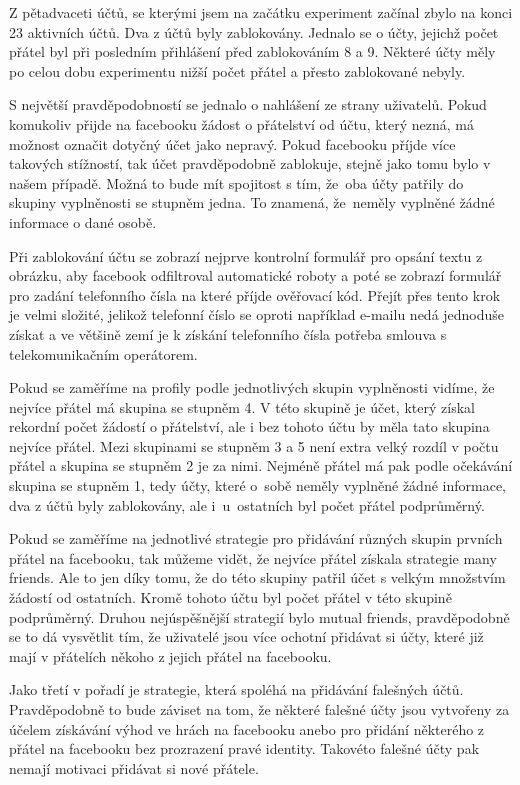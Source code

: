 \documentclass[thesis=M,czech]{FITthesis}[2013/05/10]
\begin{document}
Z pětadvaceti účtů, se kterými jsem na začátku experiment začínal zbylo na konci 23 aktivních účtů. Dva z účtů byly zablokovány. Jednalo se o účty, jejichž počet přátel byl při posledním přihlášení před zablokováním 8 a 9. Některé účty měly po celou dobu experimentu nižší počet přátel a přesto zablokované nebyly.

S největší pravděpodobností se jednalo o nahlášení ze strany uživatelů. Pokud komukoliv přijde na facebooku žádost o přátelství od účtu, který nezná, má možnost označit dotyčný účet jako nepravý. Pokud facebooku příjde více takových stížností, tak účet pravděpodobně zablokuje, stejně jako tomu bylo v našem případě. Možná to bude mít spojitost s tím, že~oba účty patřily do skupiny vyplněnosti se stupněm jedna. To znamená, že~neměly vyplněné žádné informace o dané osobě.

Při zablokování účtu se zobrazí nejprve kontrolní formulář pro opsání textu z obrázku, aby facebook odfiltroval automatické roboty a poté se zobrazí formulář pro zadání telefonního čísla na které příjde ověřovací kód. Přejít přes tento krok je velmi složité, jelikož telefonní číslo se oproti například e-mailu nedá jednoduše získat a ve většině zemí je k získání telefonního čísla potřeba smlouva s telekomunikačním operátorem.


Pokud se zaměříme na profily podle jednotlivých skupin vyplněnosti vidíme, že nejvíce přátel má skupina se stupněm 4. V této skupině je účet, který získal rekordní počet žádostí o přátelství, ale i bez tohoto účtu by měla tato skupina nejvíce přátel. Mezi skupinami se stupněm 3 a 5 není extra velký rozdíl v počtu přátel a skupina se stupněm 2 je za nimi. Nejméně přátel má pak podle očekávání skupina se stupněm 1, tedy účty, které o~sobě neměly vyplněné žádné informace, dva z účtů byly zablokovány, ale i~u~ostatních byl počet přátel podprůměrný.


Pokud se zaměříme na jednotlivé strategie pro přidávání různých skupin prvních přátel na facebooku, tak můžeme vidět, že nejvíce přátel získala strategie many friends. Ale to jen díky tomu, že do této skupiny patřil účet s velkým množstvím žádostí od ostatních. Kromě tohoto účtu byl počet přátel v této skupině podprůměrný. Druhou nejúspěšnější strategií bylo mutual friends, pravděpodobně se to dá vysvětlit tím, že uživatelé jsou více ochotní přidávat si účty, které již mají v přátelích někoho z jejich přátel na facebooku.

Jako třetí v pořadí je strategie, která spoléhá na přidávání falešných účtů. Pravděpodobně to bude záviset na tom, že některé falešné účty jsou vytvořeny za účelem získávání výhod ve hrách na facebooku anebo pro přidání některého z přátel na facebooku bez prozrazení pravé identity. Takovéto falešné účty pak nemají motivaci přidávat si nové přátele.
\end{document}
